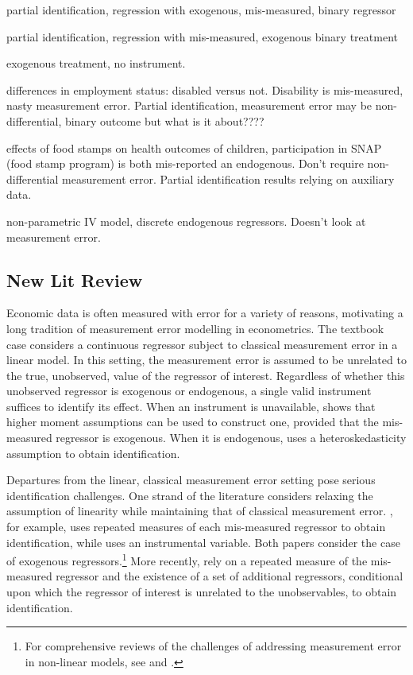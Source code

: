 \cite{Bollinger} partial identification, regression with exogenous, mis-measured, binary regressor

\cite{BollingerHasseltWP} partial identification, regression with mis-measured, exogenous binary treatment

\cite{HasseltBollinger} exogenous treatment, no instrument.


\cite{kreider2007} differences in employment status: disabled versus not. Disability is mis-measured, nasty measurement error. Partial identification, measurement error may be non-differential, binary outcome but what is it about????

\cite{kreider2012} effects of food stamps on health outcomes of children, participation in SNAP (food stamp program) is both mis-reported an endogenous.
Don't require non-differential measurement error.
Partial identification results relying on auxiliary data.

\cite{das2005} non-parametric IV model, discrete endogenous regressors. Doesn't look at measurement error.



\subsection{New Lit Review}
Economic data is often measured with error for a variety of reasons, motivating a long tradition of measurement error modelling in econometrics. 
The textbook case considers a continuous regressor subject to classical measurement error in a linear model.
In this setting, the measurement error is assumed to be unrelated to the true, unobserved, value of the regressor of interest.
Regardless of whether this unobserved regressor is exogenous or endogenous, a single valid instrument suffices to identify its effect.
When an instrument is unavailable, \cite{lewbel1997} shows that higher moment assumptions can be used to construct one, provided that the mis-measured regressor is exogenous.
When it is endogenous, \cite{lewbel2012} uses a heteroskedasticity assumption to obtain identification.

Departures from the linear, classical measurement error setting pose serious identification challenges.
One strand of the literature considers relaxing the assumption of linearity while maintaining that of classical measurement error.
\cite{schennach2004}, for example, uses repeated measures of each mis-measured regressor to obtain identification, while \cite{schennach2007} uses an instrumental variable.  
Both papers consider the case of exogenous regressors.\footnote{For comprehensive reviews of the challenges of addressing measurement error in non-linear models, see  \cite{chensurvey} and \cite{SchennachSurvey}.}
More recently, \cite{SongSchennachWhite} rely on a repeated measure of the mis-measured regressor and the existence of a set of additional regressors, conditional upon which the regressor of interest is unrelated to the unobservables, to obtain identification.      


